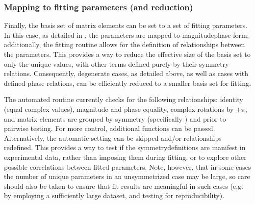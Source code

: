 \documentclass[letterpaper,table,10pt,english]{jupyterBook}
\begin{document}
\subsubsection{Mapping to fitting parameters (and reduction)}
\label{\detokenize{part2/sym-fitting-intro_220423:mapping-to-fitting-parameters-and-reduction}}\label{\detokenize{part2/sym-fitting-intro_220423:sec-basis-sets-remapping-to-fittingparams}}
\sphinxAtStartPar
Finally, the basis set of matrix elements can be set to a set of fitting parameters. In this case, as detailed in , the parameters are mapped to magnitude\sphinxhyphen{}phase form; additionally, the fitting routine allows for the definition of relationships between the parameters. This provides a way to reduce the effective size of the basis set to only the unique values, with other terms defined purely by their symmetry relations. Consequently, degenerate cases, as detailed above, as well as cases with defined phase relations, can be efficiently reduced to a smaller basis set for fitting.

\sphinxAtStartPar
The automated routine currently checks for the following relationships: identity (equal complex values), magnitude and phase equality, complex rotations by \(\pm\pi\), and matrix elements are grouped by symmetry (specifically ) and  prior to pair\sphinxhyphen{}wise testing. For more control, additional functions can be passed. Alternatively, the automatic setting can be skipped and/or relationships redefined. This provides a way to test if the symmetry\sphinxhyphen{}definitions are manifest in experimental data, rather than imposing them during fitting, or to explore other possible correlations between fitted parameters. Note, however, that in some cases the number of unique parameters in an unsymmetrized case may be large, so care should also be taken to ensure that fit results are meaningful in such cases (e.g. by employing a sufficiently large dataset, and testing for reproducibility).
\end{document}

